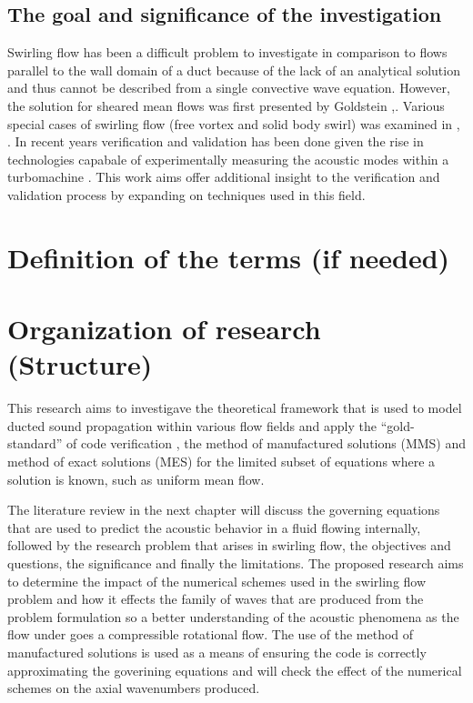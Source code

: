 \subsection{The goal and significance of the investigation}
Swirling flow has been a difficult problem to investigate in comparison to 
flows parallel to the wall domain of a duct \cite{COOPER2001} because of the 
lack of an analytical solution and thus cannot be described from a single convective 
wave equation. However, the solution for sheared mean flows was first presented
by Goldstein \cite{Goldstein1978},\cite{Goldstein1979}. Various special cases of
swirling flow (free vortex and solid body swirl) was examined in \cite{KAPUR1973}
\cite{Kerrebrock2012}, \cite{KERREBROCK1974}. In recent years verification and
validation has been done given the rise in technologies capabale of experimentally
measuring the acoustic modes within a turbomachine \cite{Maldonado2016}. This
work aims offer additional insight to the verification and validation process 
by expanding on techniques used in this field.  
\section{Definition of the terms (if needed)}
\section{Organization of research (Structure)}


This research aims to investigave the theoretical framework that is used to
model ducted sound propagation within various flow fields and apply the 
``gold-standard'' of code verification , the method of manufactured solutions 
(MMS) and method of exact solutions (MES) for the limited subset 
of equations where a solution is known, such as uniform mean flow. 


The literature review in the next chapter will discuss the governing equations that are
used to predict the acoustic behavior in a fluid flowing internally, followed 
by the research problem that arises in swirling flow, the objectives and 
questions, the significance and finally the limitations.  The proposed research aims to determine the impact of the numerical schemes used
in the swirling flow problem and how it effects the family of waves that are
produced from the problem formulation so a better understanding of the 
acoustic phenomena as the flow under goes a compressible rotational flow. The use
of the method of manufactured solutions is used as a means of ensuring the code is
correctly approximating the goverining equations and will check the effect of the numerical schemes
on the axial wavenumbers produced.
 
